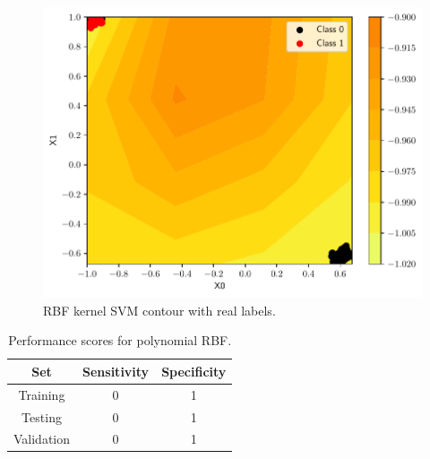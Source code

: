 \documentclass[conference]{IEEEtran}
\theoremstyle{definition}
\theoremstyle{remark}
\theoremstyle{remark}
\begin{document}
\begin{figure}
  \includegraphics[width=\columnwidth]{figs/svm-emb-rbf-contour-0-1.pdf}
  \caption{RBF kernel SVM contour with real labels.}
\end{figure}

\begin{table}
\centering
\caption{Performance scores for polynomial RBF.}
\label{tab:rbf_SVM_emb}
\begin{tabular}{ccc}
\hline
\textbf{Set} & \textbf{Sensitivity} & \textbf{Specificity} \\ \hline
Training & 0 & 1 \\
Testing & 0 & 1 \\
Validation & 0 & 1 \\ \hline
\end{tabular}
\end{table}
\end{document}
